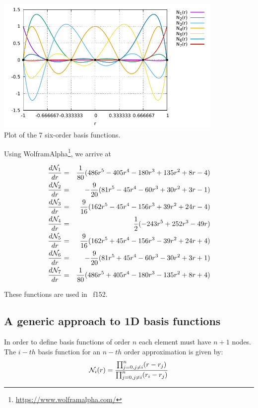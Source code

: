 \begin{center}
\includegraphics[width=11cm]{images/basis1D/Q6.pdf}\\
{\captionfont Plot of the 7 six-order basis functions.}
\end{center}

Using WolframAlpha\footnote{\url{https://www.wolframalpha.com/}}, we arrive at 

\begin{eqnarray}
\frac{d {\mathcal{N}}_1}{dr} &=& \frac{1}{80} (486r^5 - 405r^4 - 180r^3 + 135 r^2 +8r-4) \nonumber\\
\frac{d {\mathcal{N}}_2}{dr} &=& -\frac{9}{20} (81r^5 - 45r^4 -60r^3 + 30r^2 +3r -1) \nonumber\\ 
\frac{d {\mathcal{N}}_3}{dr} &=& \frac{9}{16} (162r^5-45r^4 -156r^3 +39r^2 +24r -4) \nonumber\\ 
\frac{d {\mathcal{N}}_4}{dr} &=& \frac{1}{2} (-243r^5+252r^3-49r) \nonumber\\
\frac{d {\mathcal{N}}_5}{dr} &=& \frac{9}{16} (162r^5 +45r^4 -156r^3 -39r^2 +24r +4) \nonumber\\ 
\frac{d {\mathcal{N}}_6}{dr} &=& -\frac{9}{20} (81r^5 +45r^4 -60r^3 - 30r^2 +3r +1) \nonumber\\ 
\frac{d {\mathcal{N}}_7}{dr} &=& \frac{1}{80} (486r^5 + 405r^4 - 180r^3 -135r^2 +8r+4) 
\end{eqnarray}

These functions are used in \stone~{f152}.

\subsection{A generic approach to 1D basis functions \label{sec:bfgeneric}}

In order to define basis functions of order $n$ each element 
must have $n+1$ nodes.
The $i-th$ basis function for an $n-th$ order approximation
is given by:
\[
{\mathcal{N}}_i(r) = 
\frac{
\prod_{j=0,j \ne i}^n (r-r_j)
}
{
\prod_{j=0,j \ne i}^n (r_i-r_j)
}
\]

